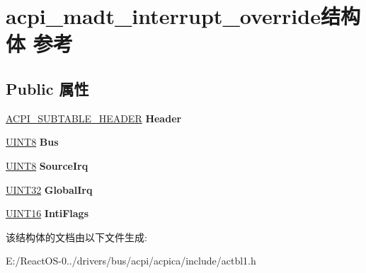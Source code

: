 \hypertarget{structacpi__madt__interrupt__override}{}\section{acpi\+\_\+madt\+\_\+interrupt\+\_\+override结构体 参考}
\label{structacpi__madt__interrupt__override}
\subsection*{Public 属性}
\begin{DoxyCompactItemize}
\item 
\mbox{\label{structacpi__madt__interrupt__override_a2df0eb839aa2a2143d1884a83c35843f}} 
\hyperlink{structacpi__subtable__header}{A\+C\+P\+I\+\_\+\+S\+U\+B\+T\+A\+B\+L\+E\+\_\+\+H\+E\+A\+D\+ER} {\bfseries Header}
\item 
\mbox{\label{structacpi__madt__interrupt__override_a3a515802015c80ef0946dff877b3cc39}} 
\hyperlink{_processor_bind_8h_ab27e9918b538ce9d8ca692479b375b6a}{U\+I\+N\+T8} {\bfseries Bus}
\item 
\mbox{\label{structacpi__madt__interrupt__override_a73883f1abe56b784206a0eb1ea13dc0c}} 
\hyperlink{_processor_bind_8h_ab27e9918b538ce9d8ca692479b375b6a}{U\+I\+N\+T8} {\bfseries Source\+Irq}
\item 
\mbox{\label{structacpi__madt__interrupt__override_abdc531e8c4a751ae4676dfe0ffafe5a3}} 
\hyperlink{_processor_bind_8h_ae1e6edbbc26d6fbc71a90190d0266018}{U\+I\+N\+T32} {\bfseries Global\+Irq}
\item 
\mbox{\label{structacpi__madt__interrupt__override_a0f0749a8b0049bd5c8c465b05e38f09c}} 
\hyperlink{_processor_bind_8h_a09f1a1fb2293e33483cc8d44aefb1eb1}{U\+I\+N\+T16} {\bfseries Inti\+Flags}
\end{DoxyCompactItemize}


该结构体的文档由以下文件生成\+:\begin{DoxyCompactItemize}
\item 
E\+:/\+React\+O\+S-\/0../drivers/bus/acpi/acpica/include/actbl1.\+h\end{DoxyCompactItemize}
